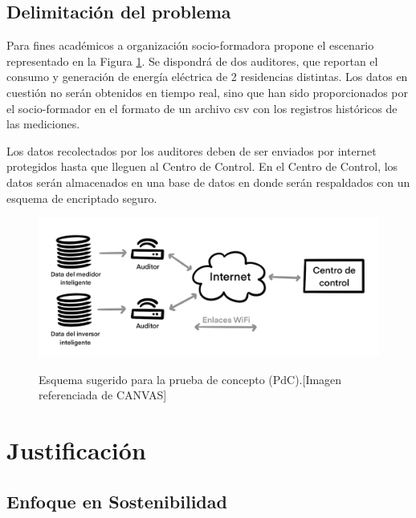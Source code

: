 \documentclass{article}
\begin{document}
        \subsection{Delimitación del problema}

            Para fines académicos a organización socio-formadora propone el escenario representado en la Figura \ref{fig:esquema}. Se dispondrá de dos auditores, que reportan el consumo y generación de energía eléctrica de 2 residencias distintas. Los datos en cuestión no serán obtenidos en tiempo real, sino que han sido proporcionados por el socio-formador en el formato de un archivo csv con los registros históricos de las mediciones.

            Los datos recolectados por los auditores deben de ser enviados por internet protegidos hasta que lleguen al Centro de Control. En el Centro de Control, los datos serán almacenados en una base de datos en donde serán respaldados con un esquema de encriptado seguro.

            \begin{figure}[h]
                \centering
                \includegraphics[scale=0.35]{img/esquema_reto.png}\\
                \caption{Esquema sugerido para la prueba de concepto (PdC).[Imagen referenciada de CANVAS]}
                \label{fig:esquema}
            \end{figure}

    \section{Justificación}

        \subsection{Enfoque en Sostenibilidad}
\end{document}
